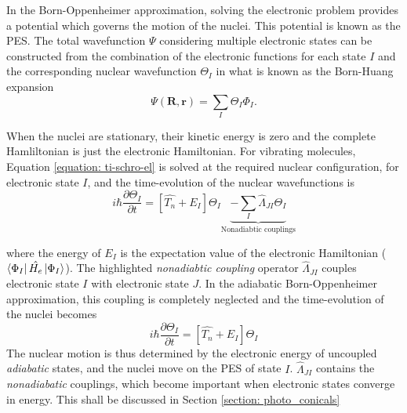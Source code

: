 In the Born-Oppenheimer approximation, solving the electronic problem provides a potential which governs the motion of the nuclei. This potential is known as the \acf{PES}.\cite{szabo1996} The total wavefunction $\Psi$ considering multiple electronic states can be constructed from the combination of the electronic functions for each state $I$ and the corresponding nuclear wavefunction $\Theta_{I}$ in what is known as the Born-Huang expansion\cite{Born1954}
\begin{equation}\label{equation: Born-Huang}
    \Psi(\bm{R},\bm{r})=\sum_{I}\Theta_{I}\Phi_{I}.
\end{equation}

When the nuclei are stationary, their kinetic energy is zero and the complete Hamliltonian is just the electronic Hamiltonian. For vibrating molecules, Equation \ref{equation: ti-schro-el} is solved at the required nuclear configuration, for electronic state $I$, and the time-evolution of the nuclear wavefunctions is\cite{Worth2004}
\begin{equation}\label{equation: nucwavefunctions}
    i\hbar{}\frac{\partial{}\Theta_{I}}{\partial{}t}=[\hat{T_{n}}+E_{I}]\Theta_{I}\underbrace{-\sum_{I}\hat{\Lambda}_{JI}\Theta_{I}}_\text{Nonadiabtic couplings}
\end{equation} 

where the energy of $E_{I}$ is the expectation value of the electronic Hamiltonian ($\bra{\Phi_{I}}\hat{H_e}\ket{\Phi_{I}}$). The highlighted \textit{nonadiabtic coupling} operator $\hat{\Lambda}_{JI}$ couples electronic state $I$ with electronic state $J$. In the adiabatic Born-Oppenheimer approximation, this coupling is completely neglected and the time-evolution of the nuclei becomes\cite{Yonehara2012}
\begin{equation}\label{equation: BO}
    i\hbar{}\frac{\partial{}\Theta_{I}}{\partial{}t}=[\hat{T_{n}}+E_{I}]\Theta_{I}
\end{equation} 
The nuclear motion is thus determined by the electronic energy of uncoupled \textit{adiabatic} states, and the nuclei move on the \ac{PES} of state $I$. $\hat{\Lambda}_{JI}$ contains the \textit{nonadiabatic} couplings, which become important when electronic states converge in energy. This shall be discussed in Section \ref{section: photo_conicals}

